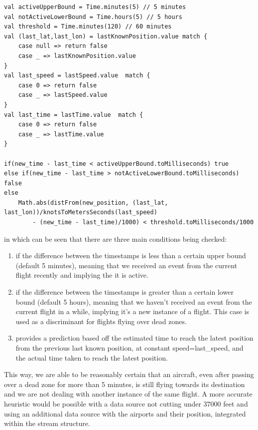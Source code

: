 \begin{verbatim}
val activeUpperBound = Time.minutes(5) // 5 minutes
val notActiveLowerBound = Time.hours(5) // 5 hours
val threshold = Time.minutes(120) // 60 minutes
val (last_lat,last_lon) = lastKnownPosition.value match {
    case null => return false
    case _ => lastKnownPosition.value
}
val last_speed = lastSpeed.value  match {
    case 0 => return false
    case _ => lastSpeed.value
}
val last_time = lastTime.value  match {
    case 0 => return false
    case _ => lastTime.value
}

if(new_time - last_time < activeUpperBound.toMilliseconds) true
else if(new_time - last_time > notActiveLowerBound.toMilliseconds) false
else
    Math.abs(distFrom(new_position, (last_lat, last_lon))/knotsToMetersSeconds(last_speed)
        - (new_time - last_time)/1000) < threshold.toMilliseconds/1000

\end{verbatim}

in which can be seen that there are three main conditions being checked:
\begin{enumerate}
    \item if the difference between the timestamps is less than a certain upper bound (default 5 minutes), meaning that we received an event from the current flight recently and implying the it is active.
    \item if the difference between the timestamps is greater than a certain lower bound (default 5 hours), meaning that we haven't received an event from the current flight in a while, implying it's a new instance of a flight. This case is used as a discriminant for flights flying over dead zones.
    \item provides a prediction based off the estimated time to reach the latest position from the previous last known position, at constant speed=last\_speed, and the actual time taken to reach the latest position.
\end{enumerate}

This way, we are able to be reasonably certain that an aircraft, even after passing over a dead zone for more than 5 minutes, is still flying towards its destination and we are not dealing with another instance of the same flight. A more accurate heuristic would be possible with a data source not cutting under 37000 feet and using an additional data source with the airports and their position, integrated within the stream structure.

